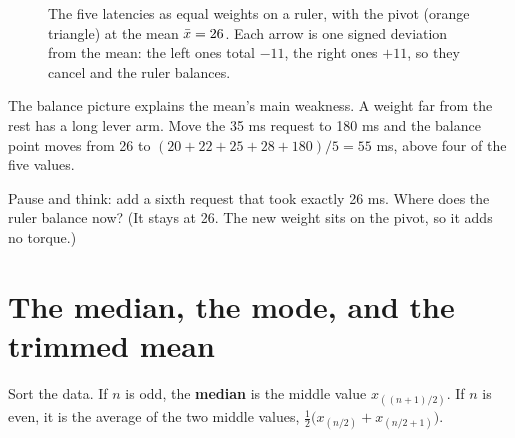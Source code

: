 \begin{figure}[H]
\centering
{}
\caption{The five latencies as equal weights on a ruler, with the pivot (orange
triangle) at the mean $\bar{x}=26$. Each arrow is one signed deviation from the mean:
the left ones total $-11$, the right ones $+11$, so they cancel and the ruler balances.}
\label{fig:center-spread-balance}
\end{figure}

The balance picture explains the mean's main weakness. A weight far from the rest
has a long lever arm. Move the 35 ms request to 180 ms and the balance point moves
from 26 to $(20+22+25+28+180)/5 = 55$ ms, above four of the five values.

\begin{recoverybox}
Pause and think: add a sixth request that took exactly 26 ms. Where does the ruler
balance now? (It stays at 26. The new weight sits on the pivot, so it adds no torque.)
\end{recoverybox}

\section{The median, the mode, and the trimmed mean}
\label{sec:center-spread-median}

\begin{definition}[Median]
Sort the data. If $n$ is odd, the \textbf{median} is the middle value
$x_{((n+1)/2)}$. If $n$ is even, it is the average of the two middle values,
$\tfrac12\big(x_{(n/2)} + x_{(n/2+1)}\big)$.
\end{definition}

